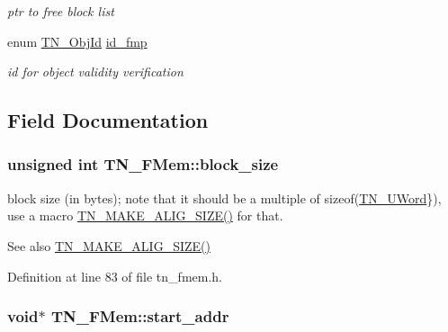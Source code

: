 \begin{DoxyCompactItemize}
\begin{DoxyCompactList}\small\item\em ptr to free block list \end{DoxyCompactList}\item 
\hypertarget{structTN__FMem_aee1235a605f90d80ec16547ea647eaff}{enum \hyperlink{tn__common_8h_ae779dd1f6735f6e139fb70acd004d976}{T\+N\+\_\+\+Obj\+Id} \hyperlink{structTN__FMem_aee1235a605f90d80ec16547ea647eaff}{id\+\_\+fmp}}\label{structTN__FMem_aee1235a605f90d80ec16547ea647eaff}

\begin{DoxyCompactList}\small\item\em id for object validity verification \end{DoxyCompactList}\end{DoxyCompactItemize}


\subsection{Field Documentation}
\hypertarget{structTN__FMem_a101e3e0eeb2774309a55ed1d6cad8e3f}{
\subsubsection[{block\+\_\+size}]{\setlength{\rightskip}{0pt plus 5cm}unsigned int T\+N\+\_\+\+F\+Mem\+::block\+\_\+size}}\label{structTN__FMem_a101e3e0eeb2774309a55ed1d6cad8e3f}


block size (in bytes); note that it should be a multiple of {\ttfamily sizeof(\hyperlink{tn__arch__example_8h_ab80cba0fe9ffcd9011d53dfeb9e39bf4}{T\+N\+\_\+\+U\+Word}\})}, use a macro {\ttfamily \hyperlink{tn__common_8h_a3f48380e8a624edc643319a81192d88e}{T\+N\+\_\+\+M\+A\+K\+E\+\_\+\+A\+L\+I\+G\+\_\+\+S\+I\+Z\+E()}} for that. 

\begin{DoxySeeAlso}{See also}
{\ttfamily \hyperlink{tn__common_8h_a3f48380e8a624edc643319a81192d88e}{T\+N\+\_\+\+M\+A\+K\+E\+\_\+\+A\+L\+I\+G\+\_\+\+S\+I\+Z\+E()}} 
\end{DoxySeeAlso}


Definition at line 83 of file tn\+\_\+fmem.\+h.

\hypertarget{structTN__FMem_a7eac768da37c99efd90ae56ebde527cf}{
\subsubsection[{start\+\_\+addr}]{\setlength{\rightskip}{0pt plus 5cm}void$\ast$ T\+N\+\_\+\+F\+Mem\+::start\+\_\+addr}}\label{structTN__FMem_a7eac768da37c99efd90ae56ebde527cf}


